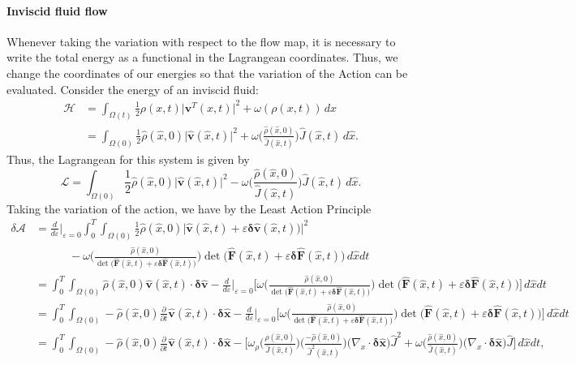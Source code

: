 \documentclass[final,10pt]{article}
\begin{document}
\paragraph{Inviscid fluid flow}
Whenever taking the variation with respect to the flow map, it is necessary to write the total energy as a functional in the Lagrangean coordinates.
Thus, we change the coordinates of our energies so that the variation of the Action can be evaluated.
Consider the energy of an inviscid fluid:
\begin{align*}
	\mathcal{H} 	&= \int_{\Omega(t)} \frac12\rho(x,t) \big|\bm v^T(x,t)\big|^2 + \omega( \rho(x,t) )\, dx	\\
				&= \int_{\Omega(0)} \frac12\hat{\rho}(\hat{x},0) \big|\hat{\bm v}(\hat{x},t) \big|^2
								+ \omega\bigg( \frac{\hat{\rho}(\hat{x},0)}{\hat{J}(\hat{x},t)} \bigg){\hat{J}(\hat{x},t)}\, d\hat{x}.
\end{align*}
Thus, the Lagrangean for this system is given by
\[	\mathcal{L}	= \int_{\Omega(0)} \frac12\hat{\rho}(\hat{x},0) \big|\hat{\bm v}(\hat{x},t) \big|^2
								- \omega\bigg( \frac{\hat{\rho}(\hat{x},0)}{\hat{J}(\hat{x},t)} \bigg){\hat{J}(\hat{x},t)}\, d\hat{x}.
\]
Taking the variation of the action, we have by the Least Action Principle
\begin{align*}
	\delta\mathcal A	&= \frac{d}{d\varepsilon}\bigg|_{\varepsilon=0} 
						\int_0^T \int_{\Omega(0)} \frac12\hat{\rho}(\hat{x},0) \big|\hat{\bm v}(\hat{x},t)+\varepsilon\bm\delta\hat{\bm v}(\hat{x},t))\big|^2\\
					&\qquad\quad		- \omega\bigg( \frac{\hat{\rho}(\hat{x},0)}{\det\big(\hat{\bm F}(\hat{x},t)+\varepsilon \bm\delta\bm\hat{F}(\hat{x},t)\big)} \bigg)
								{\det\big(\hat{\bm F}(\hat{x},t)+\varepsilon \bm\delta\bm\hat{F}(\hat{x},t)\big)}\, d\hat{x}dt	\\
					&= \int_0^T \int_{\Omega(0)} \hat{\rho}(\hat{x},0) \hat{\bm v}(\hat{x},t)\cdot\bm\delta\hat{\bm v}
							- \frac{d}{d\varepsilon}\bigg|_{\varepsilon=0} \bigg[
								\omega\bigg( \frac{\hat{\rho}(\hat{x},0)}{\det\big(\hat{\bm F}(\hat{x},t)+\varepsilon \bm\delta\bm\hat{F}(\hat{x},t)\big)} \bigg)
								{\det\big(\hat{\bm F}(\hat{x},t)+\varepsilon \bm\delta\bm\hat{F}(\hat{x},t)\big)}\bigg]\, d\hat{x}dt	\\
				&= \int_0^T \int_{\Omega(0)} -\hat{\rho}(\hat{x},0) \frac{\partial}{\partial t}\hat{\bm v}(\hat{x},t)\cdot\bm\delta\hat{\bm x}
							- \frac{d}{d\varepsilon}\bigg|_{\varepsilon=0} \bigg[
								\omega\bigg( \frac{\hat{\rho}(\hat{x},0)}{\det\big(\hat{\bm F}(\hat{x},t)+\varepsilon \bm\delta\bm\hat{F}(\hat{x},t)\big)} \bigg)
								{\det\big(\hat{\bm F}(\hat{x},t)+\varepsilon \bm\delta\bm\hat{F}(\hat{x},t)\big)}\bigg]\, d\hat{x}dt	\\
					&= \int_0^T \int_{\Omega(0)} -\hat{\rho}(\hat{x},0) \frac{\partial}{\partial t}\hat{\bm v}(\hat{x},t)\cdot\bm\delta\hat{\bm x}
							- \bigg[ \omega_\rho\bigg( \frac{\hat{\rho}(\hat{x},0)}{\hat{J}(\hat{x},t)} \bigg) \bigg(\frac{-\hat{\rho}(\hat{x},0)}{\hat{J}^2(\hat{x},t)}\bigg)
								\big(\nabla_{x} \cdot \bm\delta\hat{\bm x}\big)\hat{J}^2
								+ \omega\bigg( \frac{\hat{\rho}(\hat{x},0)}{\hat{J}(\hat{x},t)}\bigg)\big(\nabla_{x} \cdot \bm\delta\hat{\bm x}\big)\hat{J} \bigg] \, d\hat{x}dt,
\end{align*}
\end{document}
